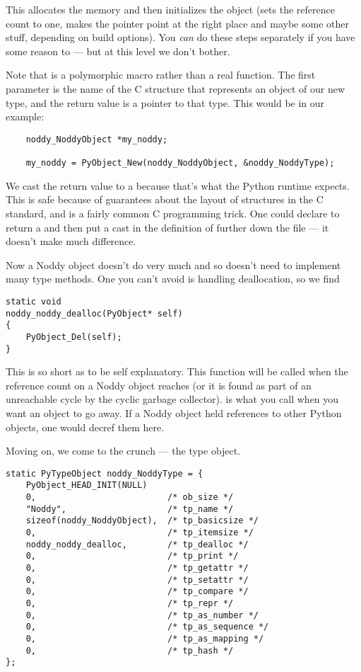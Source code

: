 This allocates the memory and then initializes the object (sets
the reference count to one, makes the  pointer point at
the right place and maybe some other stuff, depending on build options).
You \emph{can} do these steps separately if you have some reason to
--- but at this level we don't bother.

Note that  is a polymorphic macro rather
than a real function.  The first parameter is the name of the C
structure that represents an object of our new type, and the return
value is a pointer to that type.  This would be
 in our example:

\begin{verbatim}
    noddy_NoddyObject *my_noddy;

    my_noddy = PyObject_New(noddy_NoddyObject, &noddy_NoddyType);
\end{verbatim}

We cast the return value to a  because that's what
the Python runtime expects.  This is safe because of guarantees about
the layout of structures in the C standard, and is a fairly common C
programming trick.  One could declare  to
return a  and then put a cast in the
definition of  further down the file --- it
doesn't make much difference.

Now a Noddy object doesn't do very much and so doesn't need to
implement many type methods.  One you can't avoid is handling
deallocation, so we find

\begin{verbatim}
static void
noddy_noddy_dealloc(PyObject* self)
{
    PyObject_Del(self);
}
\end{verbatim}

This is so short as to be self explanatory.  This function will be
called when the reference count on a Noddy object reaches  (or
it is found as part of an unreachable cycle by the cyclic garbage
collector).   is what you call when you want
an object to go away.  If a Noddy object held references to other
Python objects, one would decref them here.

Moving on, we come to the crunch --- the type object.

\begin{verbatim}
static PyTypeObject noddy_NoddyType = {
    PyObject_HEAD_INIT(NULL)
    0,                          /* ob_size */
    "Noddy",                    /* tp_name */
    sizeof(noddy_NoddyObject),  /* tp_basicsize */
    0,                          /* tp_itemsize */
    noddy_noddy_dealloc,        /* tp_dealloc */
    0,                          /* tp_print */
    0,                          /* tp_getattr */
    0,                          /* tp_setattr */
    0,                          /* tp_compare */
    0,                          /* tp_repr */
    0,                          /* tp_as_number */
    0,                          /* tp_as_sequence */
    0,                          /* tp_as_mapping */
    0,                          /* tp_hash */
};
\end{verbatim}


